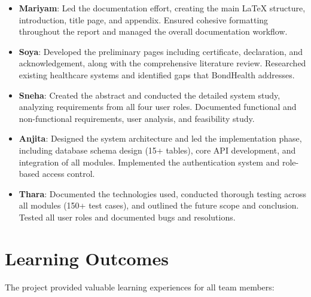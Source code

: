 \begin{itemize}
    \item \textbf{Mariyam}: Led the documentation effort, creating the main LaTeX structure, introduction, title page, and appendix. Ensured cohesive formatting throughout the report and managed the overall documentation workflow.
    
    \item \textbf{Soya}: Developed the preliminary pages including certificate, declaration, and acknowledgement, along with the comprehensive literature review. Researched existing healthcare systems and identified gaps that BondHealth addresses.
    
    \item \textbf{Sneha}: Created the abstract and conducted the detailed system study, analyzing requirements from all four user roles. Documented functional and non-functional requirements, user analysis, and feasibility study.
    
    \item \textbf{Anjita}: Designed the system architecture and led the implementation phase, including database schema design (15+ tables), core API development, and integration of all modules. Implemented the authentication system and role-based access control.
    
    \item \textbf{Thara}: Documented the technologies used, conducted thorough testing across all modules (150+ test cases), and outlined the future scope and conclusion. Tested all user roles and documented bugs and resolutions.
\end{itemize}

\section{Learning Outcomes}
The project provided valuable learning experiences for all team members:

